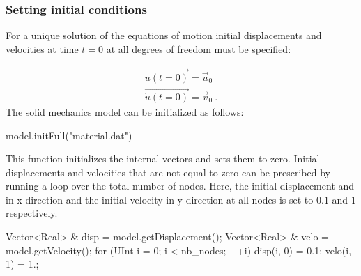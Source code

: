 \subsubsection{Setting   initial  conditions  \label{sect:smm:initial_condition}}

For  a unique  solution of  the equations  of motion  initial  displacements and
velocities at time $t=0$ at all degrees of freedom must be specified:

\begin{eqnarray}
  \vec{u(t=0)} = \vec{u}_{0}\\
  \vec{\dot u(t=0)} = \vec{v}_{0}~.
\end{eqnarray}
The solid mechanics model can be initialized as follows:
\begin{cpp}
  model.initFull("material.dat")
\end{cpp}
This function  initializes the internal vectors  and sets them  to zero. Initial
displacements and  velocities that are  not equal to  zero can be  prescribed by
running a  loop over the total  number of nodes. Here,  the initial displacement
and in x-direction  and the initial velocity in y-direction at  all nodes is set
to $0.1$ and $1$ respectively.
\begin{cpp}
  Vector<Real> & disp = model.getDisplacement();
  Vector<Real> & velo = model.getVelocity();
  for (UInt i = 0; i < nb_nodes; ++i) {
    disp(i, 0) = 0.1;
    velo(i, 1) = 1.;
  }
\end{cpp}

